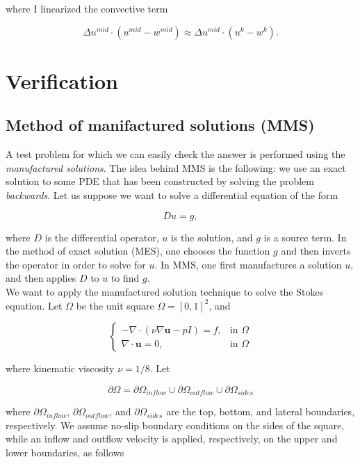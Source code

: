 \documentclass[11pt,a4paper,titlepage]{report}
\begin{document}
where I linearized the convective term

\[
\Delta u^{mid} \cdot (u^{mid} - w^{mid}) \approx \Delta u^{mid} \cdot (u^k - w^k).
\]

\chapter{Verification}

\section{Method of manifactured solutions (MMS)}

A test problem for which we can easily check the answer is performed using the \textit{manufactured solutions}. The idea behind MMS is the following: we use an exact solution to some PDE that has been constructed by solving the problem \textit{backwards}. Let us suppose we want to solve a differential equation of the form

\[
Du = g,
\]

where $D$ is the differential operator, $u$ is the solution, and $g$ is a source term. In the method of exact solution (MES), one chooses the function $g$ and then inverts the operator in order to solve for $u$. In MMS, one first manufactures a solution $u$, and then applies $D$ to $u$ to find $g$. \\

We want to apply the manufactured solution technique to solve the Stokes equation. Let $\Omega$ be the unit square $\Omega = [0,1]^2$, and

\vspace{0.2cm}
\[
\begin{cases}
- \nabla \cdot (\nu \nabla \mathbf{u} - pI) = f, & \mbox{in } \Omega \\
\nabla \cdot \mathbf{u} = 0, & \mbox{in } \Omega
\end{cases}
\]
\vspace{0.2cm}

where kinematic viscosity $\nu = 1/8$. Let

\[
\partial \Omega = \partial \Omega_{inflow} \cup \partial \Omega_{outflow} \cup \partial \Omega_{sides}
\]

where $\partial \Omega_{inflow}$, $\partial \Omega_{outflow}$, and $\partial \Omega_{sides}$ are the top, bottom, and lateral boundaries, respectively. We assume no-slip boundary conditions on the sides of the square, while an inflow and outflow velocity is applied, respectively, on the upper and lower boundaries, as follows
\end{document}
